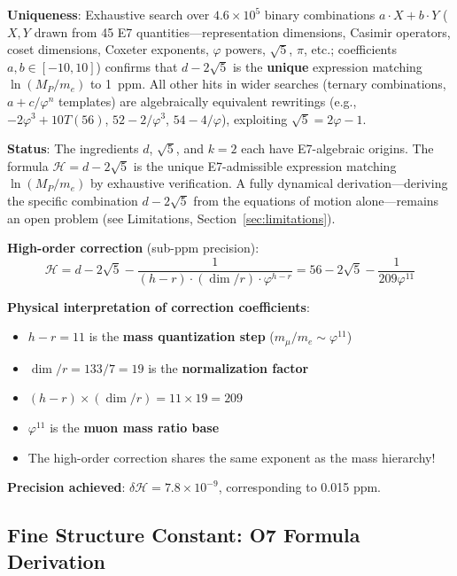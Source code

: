 \documentclass[11pt,a4paper]{article}
\begin{document}
\textbf{Uniqueness}: Exhaustive search over $4.6 \times 10^5$ binary combinations $a\cdot X + b\cdot Y$ ($X, Y$ drawn from 45 E7 quantities---representation dimensions, Casimir operators, coset dimensions, Coxeter exponents, $\varphi$ powers, $\sqrt{5}$, $\pi$, etc.; coefficients $a,b \in [-10, 10]$) confirms that $d - 2\sqrt{5}$ is the \textbf{unique} expression matching $\ln(M_P/m_e)$ to 1~ppm. All other hits in wider searches (ternary combinations, $a + c/\varphi^n$ templates) are algebraically equivalent rewritings (e.g., $-2\varphi^3 + 10 T(56)$, $52 - 2/\varphi^3$, $54 - 4/\varphi$), exploiting $\sqrt{5} = 2\varphi - 1$.

\textbf{Status}: The ingredients $d$, $\sqrt{5}$, and $k=2$ each have E7-algebraic origins. The formula $\mathcal{H} = d - 2\sqrt{5}$ is the unique E7-admissible expression matching $\ln(M_P/m_e)$ by exhaustive verification. A fully dynamical derivation---deriving the specific combination $d - 2\sqrt{5}$ from the equations of motion alone---remains an open problem (see Limitations, Section~\ref{sec:limitations}).

\textbf{High-order correction} (sub-ppm precision):
\begin{equation}
\boxed{\mathcal{H} = d - 2\sqrt{5} - \frac{1}{(h-r) \cdot (\dim/r) \cdot \varphi^{h-r}} = 56 - 2\sqrt{5} - \frac{1}{209\varphi^{11}}}
\end{equation}

\textbf{Physical interpretation of correction coefficients}:
\begin{itemize}
\item $h - r = 11$ is the \textbf{mass quantization step} ($m_\mu/m_e \sim \varphi^{11}$)
\item $\dim/r = 133/7 = 19$ is the \textbf{normalization factor}
\item $(h-r) \times (\dim/r) = 11 \times 19 = 209$
\item $\varphi^{11}$ is the \textbf{muon mass ratio base}
\item The high-order correction shares the same exponent as the mass hierarchy!
\end{itemize}

\textbf{Precision achieved}: $\delta\mathcal{H} = 7.8 \times 10^{-9}$, corresponding to 0.015 ppm.

\subsection{Fine Structure Constant: O7 Formula Derivation}
\end{document}
